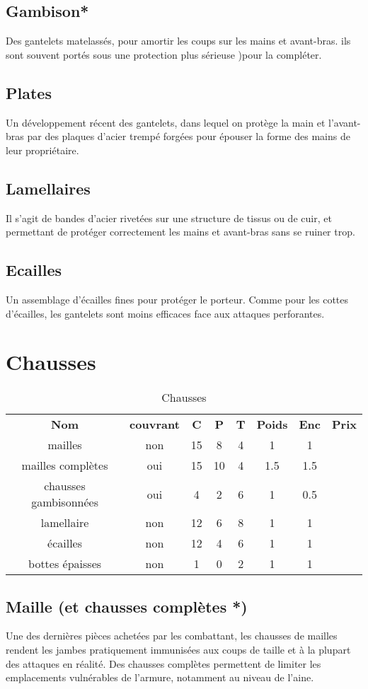 \documentclass[10pt,a4paper,twocolumn]{book}
\begin{document}
\subsection*{Gambison*}
Des gantelets matelassés, pour amortir les coups sur les mains et avant-bras. ils sont souvent portés sous une protection plus sérieuse )pour la compléter.
\subsection*{Plates}
Un développement récent des gantelets, dans lequel on protège la main et l'avant-bras par des plaques d'acier trempé forgées pour épouser la forme des mains de leur propriétaire.
\subsection*{Lamellaires}
Il s'agit de bandes d'acier rivetées sur une structure de tissus ou de cuir, et permettant de protéger correctement les mains et avant-bras sans se ruiner trop.
\subsection*{Ecailles}
Un assemblage d'écailles fines pour protéger le porteur. Comme pour les cottes d'écailles, les gantelets sont moins efficaces face aux attaques perforantes.
\section{Chausses}
\begin{table*}
\caption{Chausses}
\label{tablechausses}
\begin{tabular}{cccccccc}
\textbf{Nom}&\textbf{couvrant}&\textbf{C}&\textbf{P}&\textbf{T}&\textbf{Poids}&\textbf{Enc}&\textbf{Prix}\\
mailles & non & 15 & 8 & 4 & 1 & 1 \\
mailles complètes & oui & 15 & 10 & 4 & 1.5 & 1.5 \\
chausses gambisonnées & oui & 4 & 2 & 6 & 1 & 0.5 \\
lamellaire & non & 12 & 6 & 8 & 1 & 1 \\
écailles & non & 12 & 4 & 6 & 1 & 1 \\
bottes épaisses & non & 1 & 0 & 2 & 1 & 1 \\
\end{tabular}
\end{table*}
\subsection*{Maille (et chausses complètes *)}
Une des dernières pièces achetées par les combattant, les chausses de mailles rendent les jambes pratiquement immunisées aux coups de taille et à la plupart des attaques en réalité. Des chausses complètes permettent de limiter les emplacements vulnérables de l'armure, notamment au niveau de l'aine.
\end{document}
